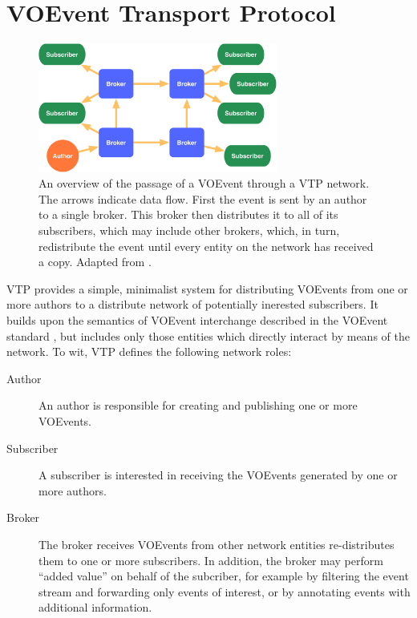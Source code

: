 \documentclass[5p,authoryear]{elsarticle}
\begin{document}
\section{VOEvent Transport Protocol}
\label{sec:vtp}

\begin{figure}
  \begin{center}
  \includegraphics[width=0.7\textwidth]{figures/vtp.pdf}
  \end{center}

  \caption{An overview of the passage of a VOEvent through a VTP network. The
  arrows indicate data flow. First the event is sent by an author to a single
  broker. This broker then distributes it to all of its subscribers, which may
  include other brokers, which, in turn, redistribute the event until every
  entity on the network has received a copy.  Adapted from
  \citet{Swinbank:2014}.}

  \label{fig:vtp}
\end{figure}

VTP provides a simple, minimalist system for distributing VOEvents from one or
more authors to a distribute network of potentially inerested subscribers. It
builds upon the semantics of VOEvent interchange described in the VOEvent
standard \citep{Seaman:2011}, but includes only those entities which directly
interact by means of the network. To wit, VTP defines the following network
roles:

\begin{description}

  \item[Author]{An author is responsible for creating and publishing one or
  more VOEvents.}

  \item[Subscriber]{A subscriber is interested in receiving the VOEvents
  generated by one or more authors.}

  \item[Broker]{The broker receives VOEvents from other network entities
  re-distributes them to one or more subscribers. In addition, the broker may
  perform ``added value'' on behalf of the subcriber, for example by filtering
  the event stream and forwarding only events of interest, or by annotating
  events with additional information.}

\end{description}
\end{document}
